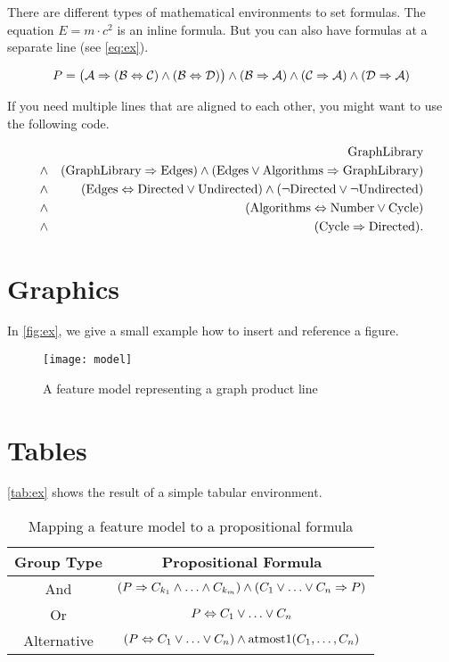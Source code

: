 There are different types of mathematical environments to set formulas. The equation $E=m\cdot c^2$ is an inline formula. But you can also have formulas at a separate line (see \vref{eq:ex}).

	\begin{equation}\label{eq:ex}
			P=\bigl(\mathcal{A}\Rightarrow(\mathcal{B}\Leftrightarrow\mathcal{C})\wedge(\mathcal{B}\Leftrightarrow\mathcal{D})\bigr)\wedge(\mathcal{B}\Rightarrow\mathcal{A})\wedge(\mathcal{C}\Rightarrow\mathcal{A})\wedge(\mathcal{D}\Rightarrow\mathcal{A})
	\end{equation}

If you need multiple lines that are aligned to each other, you might want to use the following code.

	\newcommand{\fG}{\mbox{GraphLibrary}}
	\newcommand{\fE}{\mbox{Edges}}
	\newcommand{\fA}{\mbox{Algorithms}}
	\newcommand{\fD}{\mbox{Directed}}
	\newcommand{\fU}{\mbox{Undirected}}
	\newcommand{\fN}{\mbox{Number}}
	\newcommand{\fC}{\mbox{Cycle}}
	\begin{eqnarray*}
	&& \fG\\
	&\pand& (\fG \pimplies \fE) \pand (\fE \por \fA \pimplies \fG)\\
	&\pand& (\fE \pequals \fD \por \fU) \pand (\pnot \fD \por \pnot \fU)\\
	&\pand& (\fA \pequals \fN \por \fC)\\
	&\pand& (\fC \pimplies \fD).\\
	\end{eqnarray*}

\section{Graphics}

In \vref{fig:ex}, we give a small example how to insert and reference a figure.

\begin{figure}[htbp]
	\centering
		\texttt{[image: model]}
	\caption{A feature model representing a graph product line}
	\label{fig:ex}
\end{figure}

\section{Tables}

\vref{tab:ex} shows the result of a simple tabular environment.

\begin{table}[htbp]
	\centering
		\begin{tabular}{cc}\toprule
			Group Type & Propositional Formula\\\midrule
			And & $(P \Rightarrow C_{k_1} \wedge\ldots\wedge C_{k_m}) \wedge (C_1\vee\ldots\vee C_n \Rightarrow P)$\\\addlinespace
			Or & $P \Leftrightarrow C_1\vee\ldots\vee C_n$\\\addlinespace
			Alternative & $(P \Leftrightarrow C_1\vee\ldots\vee C_n) \wedge \mbox{atmost}1(C_1,\ldots,C_n)$\\
			\bottomrule
		\end{tabular}
	\caption{Mapping a feature model to a propositional formula}
	\label{tab:ex}
\end{table}

